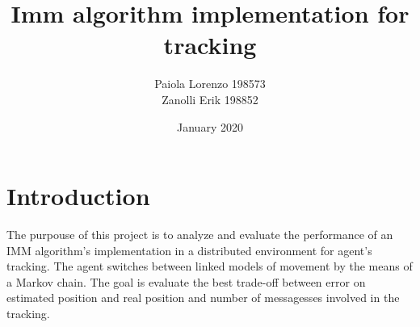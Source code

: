 \documentclass{article}
\title{Imm algorithm implementation for tracking}
\author{
Paiola Lorenzo 198573 

Zanolli Erik 198852}
\date{January 2020}
\begin{document}
\maketitle



\section*{Introduction}
\justify
The purpouse of this project is to analyze and evaluate the performance of an IMM algorithm's implementation in a distributed environment for
agent's tracking. The agent switches between linked models of movement by the means of a Markov chain. The goal is evaluate the best trade-off
between error on estimated position and real position and number of messagesses involved in the tracking.
\end{document}
